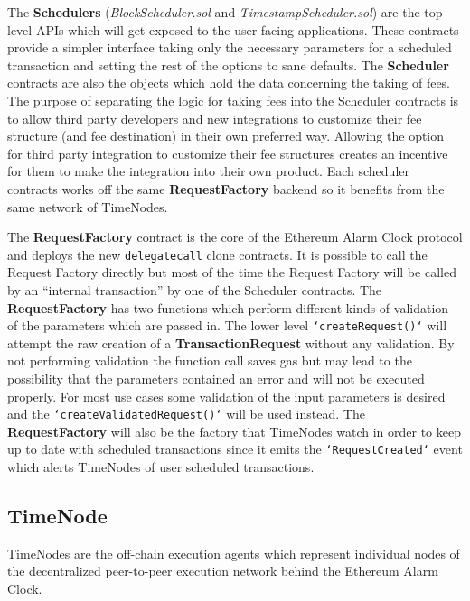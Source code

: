 \documentclass{report}
\begin{document}
  The \textbf{Schedulers} (\textit{BlockScheduler.sol} and \textit{TimestampScheduler.sol}) are the top level APIs which will get exposed to the user facing applications. These contracts provide a simpler interface taking only the necessary parameters for a scheduled transaction and setting the rest of the options to sane defaults. The \textbf{Scheduler} contracts are also the objects which hold the data concerning the taking of fees. The purpose of separating the logic for taking fees into the Scheduler contracts is to allow third party developers and new integrations to customize their fee structure (and fee destination) in their own preferred way. Allowing the option for third party integration to customize their fee structures creates an incentive for them to make the integration into their own product. Each scheduler contracts works off the same \textbf{RequestFactory} backend so it benefits from the same network of TimeNodes.

  The \textbf{RequestFactory} contract is the core of the Ethereum Alarm Clock protocol and deploys the new \texttt{delegatecall} clone contracts. It is possible to call the Request Factory directly but most of the time the Request Factory will be called by an “internal transaction” by one of the Scheduler contracts. The \textbf{RequestFactory} has two functions which perform different kinds of validation of the parameters which are passed in. The lower level \texttt{`createRequest()`} will attempt the raw creation of a \textbf{TransactionRequest} without any validation. By not performing validation the function call saves gas but may lead to the possibility that the parameters contained an error and will not be executed properly. For most use cases some validation of the input parameters is desired and the \texttt{`createValidatedRequest()`} will be used instead. The \textbf{RequestFactory} will also be the factory that TimeNodes watch in order to keep up to date with scheduled transactions since it emits the \texttt{`RequestCreated`} event which alerts TimeNodes of user scheduled transactions.

  \subsection{TimeNode}
  TimeNodes are the off-chain execution agents which represent individual nodes of the decentralized peer-to-peer execution network behind the Ethereum Alarm Clock.
\end{document}
